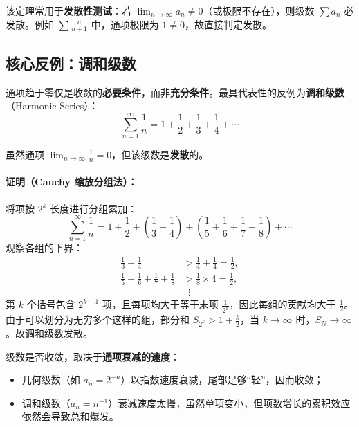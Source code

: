 \begin{remark}
该定理常用于\textbf{发散性测试}：若 \(\lim_{n \to \infty} a_n \neq 0\)（或极限不存在），则级数 \(\sum a_n\) 必发散。例如 \(\sum \frac{n}{n+1}\) 中，通项极限为 \(1 \neq 0\)，故直接判定发散。
\end{remark}

\subsection{核心反例：调和级数}

通项趋于零仅是收敛的\textbf{必要条件}，而非\textbf{充分条件}。最具代表性的反例为\textbf{调和级数}（Harmonic Series）：
\[
\sum_{n=1}^{\infty} \frac{1}{n} = 1 + \frac{1}{2} + \frac{1}{3} + \frac{1}{4} + \cdots
\]

虽然通项 \(\lim_{n \to \infty} \frac{1}{n} = 0\)，但该级数是\textbf{发散}的。



\paragraph{证明（Cauchy 缩放分组法）：}
将项按 \(2^{k}\) 长度进行分组累加：
\[
\sum_{n=1}^{\infty} \frac{1}{n} = 1 + \frac{1}{2} + \left(\frac{1}{3} + \frac{1}{4}\right) + \left(\frac{1}{5} + \frac{1}{6} + \frac{1}{7} + \frac{1}{8}\right) + \cdots
\]
观察各组的下界：
\begin{align*}
\frac{1}{3} + \frac{1}{4} &> \frac{1}{4} + \frac{1}{4} = \frac{1}{2}, \\
\frac{1}{5} + \frac{1}{6} + \frac{1}{7} + \frac{1}{8} &> \frac{1}{8} \times 4 = \frac{1}{2}, \\
& \;\;\vdots
\end{align*}
第 \(k\) 个括号包含 \(2^{k-1}\) 项，且每项均大于等于末项 \(\frac{1}{2^k}\)，因此每组的贡献均大于 \(\frac{1}{2}\)。由于可以划分为无穷多个这样的组，部分和 \(S_{2^k} > 1 + \frac{k}{2}\)，当 \(k \to \infty\) 时，\(S_N \to \infty\)。故调和级数发散。

\begin{remark}[直观对比]
级数是否收敛，取决于\textbf{通项衰减的速度}：
\begin{itemize}
    \item 几何级数（如 \(a_n = 2^{-n}\)）以指数速度衰减，尾部足够``轻''，因而收敛；
    \item 调和级数（\(a_n = n^{-1}\)）衰减速度太慢，虽然单项变小，但项数增长的累积效应依然会导致总和爆发。
\end{itemize}
\end{remark}


